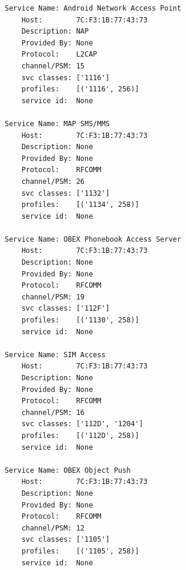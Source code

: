\documentclass[a4paper,12pt]{extarticle}  %
\begin{document}
\begin{enumerate}
\begin{lstlisting}
Service Name: Android Network Access Point
    Host:        7C:F3:1B:77:43:73
    Description: NAP
    Provided By: None
    Protocol:    L2CAP
    channel/PSM: 15
    svc classes: ['1116']
    profiles:    [('1116', 256)]
    service id:  None

Service Name: MAP SMS/MMS
    Host:        7C:F3:1B:77:43:73
    Description: None
    Provided By: None
    Protocol:    RFCOMM
    channel/PSM: 26
    svc classes: ['1132']
    profiles:    [('1134', 258)]
    service id:  None

Service Name: OBEX Phonebook Access Server
    Host:        7C:F3:1B:77:43:73
    Description: None
    Provided By: None
    Protocol:    RFCOMM
    channel/PSM: 19
    svc classes: ['112F']
    profiles:    [('1130', 258)]
    service id:  None

Service Name: SIM Access
    Host:        7C:F3:1B:77:43:73
    Description: None
    Provided By: None
    Protocol:    RFCOMM
    channel/PSM: 16
    svc classes: ['112D', '1204']
    profiles:    [('112D', 258)]
    service id:  None

Service Name: OBEX Object Push
    Host:        7C:F3:1B:77:43:73
    Description: None
    Provided By: None
    Protocol:    RFCOMM
    channel/PSM: 12
    svc classes: ['1105']
    profiles:    [('1105', 258)]
    service id:  None



\end{lstlisting}
\end{enumerate}
\end{document}
